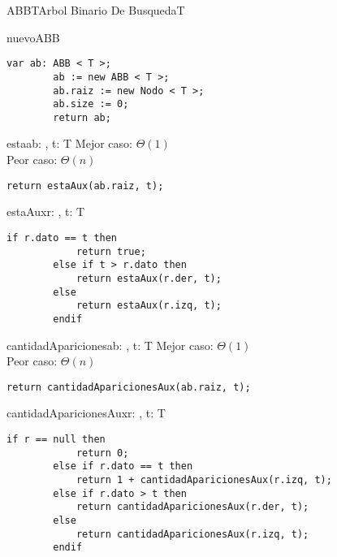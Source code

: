 \begin{module}{ABB}{T}{Arbol Binario De Busqueda}{T}



	\begin{proc}{nuevoABB}{}{\moduletype}
		\begin{lstlisting}[numbers=none,frame=none]
		var ab: ABB < T >;
		ab := new ABB < T >;
		ab.raiz := new Nodo < T >;
		ab.size := 0;
		return ab;
		\end{lstlisting}
	\end{proc}

	\begin{proc}{esta}{\In ab: \moduletype, \In t: T}{\bool}
		Mejor caso: $\Theta(1)$\\
		Peor caso: $\Theta(n)$
		\begin{lstlisting}[numbers=none,frame=none]
		return estaAux(ab.raiz, t);
		\end{lstlisting}
	\end{proc}

	\begin{proc}{estaAux}{\In r: \nodo, \In t: T}{\bool}
		\begin{lstlisting}[numbers=none,frame=none]
		if r.dato == t then
			return true;
		else if t > r.dato then
			return estaAux(r.der, t);
		else
			return estaAux(r.izq, t);
		endif
		\end{lstlisting}
	\end{proc}

	\begin{proc}{cantidadApariciones}{\In ab: \moduletype, \In t: T}{\Int}
		Mejor caso: $\Theta(1)$ \\
		Peor caso: $\Theta(n)$
		\begin{lstlisting}[numbers=none,frame=none]
		return cantidadAparicionesAux(ab.raiz, t);
		\end{lstlisting}
	\end{proc}

	\begin{proc}{cantidadAparicionesAux}{\In r: \nodo, \In t: T}{\Int}
		\begin{lstlisting}[numbers=none,frame=none]
		if r == null then
			return 0;
		else if r.dato == t then
			return 1 + cantidadAparicionesAux(r.izq, t);
		else if r.dato > t then
			return cantidadAparicionesAux(r.der, t);
		else
			return cantidadAparicionesAux(r.izq, t);
		endif
		\end{lstlisting}
	\end{proc}


\end{module}
